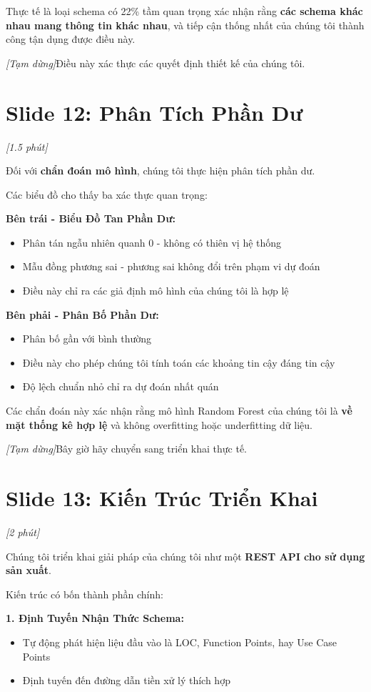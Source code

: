 \documentclass[12pt,a4paper]{article}
\newcommand{\slide}[1]{\section*{\textcolor{slidenum}{Slide #1}}}
\newcommand{\timing}[1]{\textcolor{timing}{\textit{[#1]}}}
\newcommand{\keypoint}[1]{\textcolor{keypoint}{\textbf{#1}}}
\newcommand{\pause}{\textit{[Tạm dừng]}}
\begin{document}
Thực tế là loại schema có 22\% tầm quan trọng xác nhận rằng \textbf{các schema khác nhau mang thông tin khác nhau}, và tiếp cận thống nhất của chúng tôi thành công tận dụng được điều này.

\pause Điều này xác thực các quyết định thiết kế của chúng tôi.

\slide{12: Phân Tích Phần Dư}
\timing{1.5 phút}

Đối với \keypoint{chẩn đoán mô hình}, chúng tôi thực hiện phân tích phần dư.

Các biểu đồ cho thấy ba xác thực quan trọng:

\textbf{Bên trái - Biểu Đồ Tan Phần Dư:}
\begin{itemize}
    \item Phân tán ngẫu nhiên quanh 0 - không có thiên vị hệ thống
    \item Mẫu đồng phương sai - phương sai không đổi trên phạm vi dự đoán
    \item Điều này chỉ ra các giả định mô hình của chúng tôi là hợp lệ
\end{itemize}

\textbf{Bên phải - Phân Bố Phần Dư:}
\begin{itemize}
    \item Phân bố gần với bình thường
    \item Điều này cho phép chúng tôi tính toán các khoảng tin cậy đáng tin cậy
    \item Độ lệch chuẩn nhỏ chỉ ra dự đoán nhất quán
\end{itemize}

Các chẩn đoán này xác nhận rằng mô hình Random Forest của chúng tôi là \textbf{về mặt thống kê hợp lệ} và không overfitting hoặc underfitting dữ liệu.

\pause Bây giờ hãy chuyển sang triển khai thực tế.

\slide{13: Kiến Trúc Triển Khai}
\timing{2 phút}

Chúng tôi triển khai giải pháp của chúng tôi như một \keypoint{REST API cho sử dụng sản xuất}.

Kiến trúc có bốn thành phần chính:

\textbf{1. Định Tuyến Nhận Thức Schema:}
\begin{itemize}
    \item Tự động phát hiện liệu đầu vào là LOC, Function Points, hay Use Case Points
    \item Định tuyến đến đường dẫn tiền xử lý thích hợp
\end{itemize}
\end{document}
